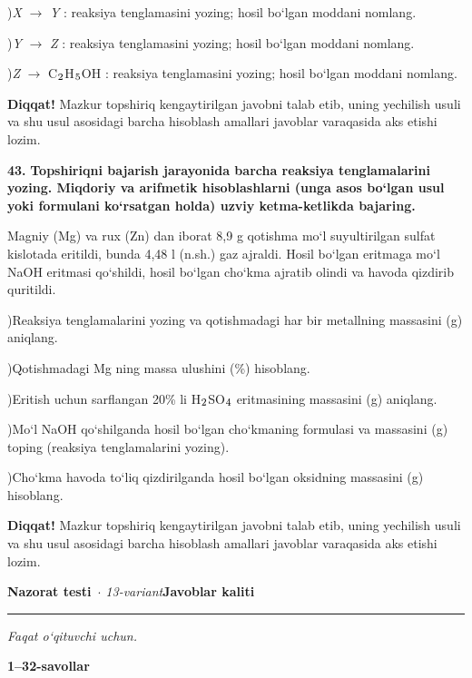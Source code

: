 \documentclass[11pt,a4paper]{article}
\renewcommand{\textsubscript}[1]{\ensuremath{_{\text{\fontsize{8}{8}\selectfont #1}}}}
\newcommand{\diqqat}[1]{\par\smallskip\noindent\textbf{Diqqat!} #1\par\medskip}
\begin{document}
)\textit{X} $\to$ \textit{Y} : reaksiya tenglamasini yozing; hosil bo`lgan moddani nomlang.\par
{})\textit{Y} $\to$ \textit{Z} : reaksiya tenglamasini yozing; hosil bo`lgan moddani nomlang.\par
{})\textit{Z} $\to$ C\textsubscript{2}H\textsubscript{5}OH : reaksiya tenglamasini yozing; hosil bo`lgan moddani nomlang.\par
\diqqat{Mazkur topshiriq kengaytirilgan javobni talab etib, uning yechilish usuli va shu usul asosidagi barcha hisoblash amallari javoblar varaqasida aks etishi lozim.}
\noindent\textbf{43.} \textbf{Topshiriqni bajarish jarayonida barcha reaksiya tenglamalarini yozing. Miqdoriy va arifmetik hisoblashlarni (unga asos bo`lgan usul yoki formulani ko`rsatgan holda) uzviy ketma-ketlikda bajaring.}\par\smallskip
Magniy (Mg) va rux (Zn) dan iborat 8,9 g qotishma mo`l suyultirilgan sulfat kislotada eritildi, bunda 4,48 l (n.sh.) gaz ajraldi. Hosil bo`lgan eritmaga mo`l NaOH eritmasi qo`shildi, hosil bo`lgan cho`kma ajratib olindi va havoda qizdirib quritildi.\par
{})Reaksiya tenglamalarini yozing va qotishmadagi har bir metallning massasini (g) aniqlang.\par
{})Qotishmadagi Mg ning massa ulushini (\%) hisoblang.\par
{})Eritish uchun sarflangan 20\% li H\textsubscript{2}SO\textsubscript{4} eritmasining massasini (g) aniqlang.\par
{})Mo`l NaOH qo`shilganda hosil bo`lgan cho`kmaning formulasi va massasini (g) toping (reaksiya tenglamalarini yozing).\par
{})Cho`kma havoda to`liq qizdirilganda hosil bo`lgan oksidning massasini (g) hisoblang.\par
\diqqat{Mazkur topshiriq kengaytirilgan javobni talab etib, uning yechilish usuli va shu usul asosidagi barcha hisoblash amallari javoblar varaqasida aks etishi lozim.}
\newpage
\noindent\textbf{\fontsize{13}{15}\selectfont Nazorat testi}\ \textit{$\cdot$ 13-variant}\hfill \textbf{Javoblar kaliti}\par\smallskip\hrule\smallskip
\textit{Faqat o`qituvchi uchun.}\par\medskip
\noindent\textbf{1--32-savollar}\par\smallskip
\end{document}
